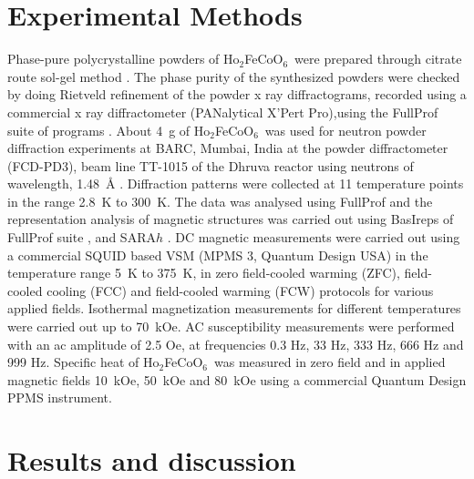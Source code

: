 \documentclass[12pt,twocolumns]{iopart}
\newcommand{\HFCO}{Ho$_2$FeCoO$_6$}
\begin{document}
\section{\label{exptl}Experimental Methods}
Phase-pure polycrystalline powders of \HFCO\ were prepared through citrate
route sol-gel method \cite{haripriya12017temperature}.
The phase purity of the synthesized powders were checked by doing
Rietveld refinement \cite{rietveld_profile_1969} of the powder
x ray diffractograms, recorded using a commercial x ray diffractometer (PANalytical X'Pert Pro),using the FullProf suite of programs \cite{fullprof}.
About 4~g of \HFCO\ was used for neutron powder diffraction experiments
at BARC, Mumbai, India at the powder diffractometer (FCD-PD3), beam line TT-1015 
of the Dhruva reactor using neutrons of wavelength, 1.48~{\AA} \cite{barc_diffractometer}. 
Diffraction patterns were collected at 11 temperature points in the range
2.8~K to 300~K. The data was analysed using FullProf and the
representation analysis of magnetic structures was carried out
using  BasIreps of FullProf suite \cite{rodriguez2011basireps},\cite{ritter2011neutrons} and SARA$h$ \cite{sarah}.
DC magnetic measurements were carried out using a commercial SQUID based VSM (MPMS 3, Quantum Design USA)
in the temperature range 5~K to 375~K, in zero field-cooled warming (ZFC), field-cooled cooling (FCC)
and field-cooled warming (FCW) protocols for various applied fields.
Isothermal magnetization measurements for different temperatures were carried out up to 70~kOe.
AC susceptibility measurements were performed with an ac amplitude of 2.5 Oe, at frequencies 0.3 Hz, 33 Hz, 333 Hz, 666 Hz and 999 Hz.
Specific heat of \HFCO\ was measured in zero field and in applied magnetic fields
10~kOe, 50~kOe and 80~kOe using a commercial Quantum Design PPMS instrument.
\section{\label{results} Results and discussion}
\end{document}

